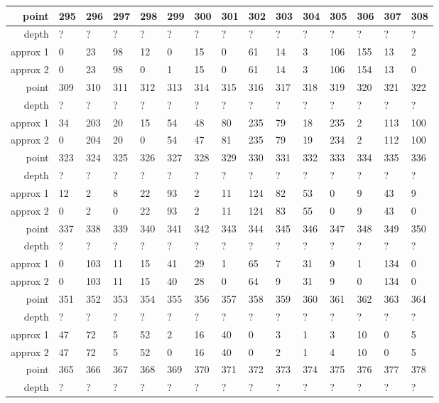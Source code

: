 \begin{center}
\begin{supertabular}{|r|l l l l l l l l l l l l l l|}
\hline
point & 295 & 296 & 297 & 298 & 299 & 300 & 301 & 302 & 303 & 304 & 305 & 306 & 307 & 308 \\
\hline
depth & ? & ? & ? & ? & ? & ? & ? & ? & ? & ? & ? & ? & ? & ? \\
approx 1 & 0 & 23 & 98 & 12 & 0 & 15 & 0 & 61 & 14 & 3 & 106 & 155 & 13 & 2 \\
approx 2 & 0 & 23 & 98 & 0 & 1 & 15 & 0 & 61 & 14 & 3 & 106 & 154 & 13 & 0 \\
\hline
point & 309 & 310 & 311 & 312 & 313 & 314 & 315 & 316 & 317 & 318 & 319 & 320 & 321 & 322 \\
\hline
depth & ? & ? & ? & ? & ? & ? & ? & ? & ? & ? & ? & ? & ? & ? \\
approx 1 & 34 & 203 & 20 & 15 & 54 & 48 & 80 & 235 & 79 & 18 & 235 & 2 & 113 & 100 \\
approx 2 & 0 & 204 & 20 & 0 & 54 & 47 & 81 & 235 & 79 & 19 & 234 & 2 & 112 & 100 \\
\hline
point & 323 & 324 & 325 & 326 & 327 & 328 & 329 & 330 & 331 & 332 & 333 & 334 & 335 & 336 \\
\hline
depth & ? & ? & ? & ? & ? & ? & ? & ? & ? & ? & ? & ? & ? & ? \\
approx 1 & 12 & 2 & 8 & 22 & 93 & 2 & 11 & 124 & 82 & 53 & 0 & 9 & 43 & 9 \\
approx 2 & 0 & 2 & 0 & 22 & 93 & 2 & 11 & 124 & 83 & 55 & 0 & 9 & 43 & 0 \\
\hline
point & 337 & 338 & 339 & 340 & 341 & 342 & 343 & 344 & 345 & 346 & 347 & 348 & 349 & 350 \\
\hline
depth & ? & ? & ? & ? & ? & ? & ? & ? & ? & ? & ? & ? & ? & ? \\
approx 1 & 0 & 103 & 11 & 15 & 41 & 29 & 1 & 65 & 7 & 31 & 9 & 1 & 134 & 0 \\
approx 2 & 0 & 103 & 11 & 15 & 40 & 28 & 0 & 64 & 9 & 31 & 9 & 0 & 134 & 0 \\
\hline
point & 351 & 352 & 353 & 354 & 355 & 356 & 357 & 358 & 359 & 360 & 361 & 362 & 363 & 364 \\
\hline
depth & ? & ? & ? & ? & ? & ? & ? & ? & ? & ? & ? & ? & ? & ? \\
approx 1 & 47 & 72 & 5 & 52 & 2 & 16 & 40 & 0 & 3 & 1 & 3 & 10 & 0 & 5 \\
approx 2 & 47 & 72 & 5 & 52 & 0 & 16 & 40 & 0 & 2 & 1 & 4 & 10 & 0 & 5 \\
\hline
point & 365 & 366 & 367 & 368 & 369 & 370 & 371 & 372 & 373 & 374 & 375 & 376 & 377 & 378 \\
\hline
depth & ? & ? & ? & ? & ? & ? & ? & ? & ? & ? & ? & ? & ? & ? \\

\end{supertabular}
\end{center}
